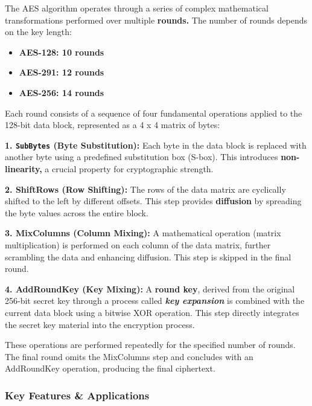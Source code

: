 The AES algorithm operates through a series of complex mathematical transformations performed over multiple \textbf{rounds. }The number of rounds depends on the key length:

\begin{itemize}
    \item \textbf{\textbf{AES-128: }10 rounds}
    \item \textbf{\textbf{AES-291: }12 rounds}
    \item \textbf{\textbf{AES-256: 14 rounds}}
\end{itemize}

Each round consists of a sequence of four fundamental operations applied to the 128-bit data block, represented as a 4 x 4 matrix of bytes:

\textbf{1. \texttt{SubBytes} (Byte Substitution): }Each byte in the data block is replaced with another byte using a predefined substitution box (S-box). This introduces \textbf{non-linearity, }a crucial property for cryptographic strength.

\textbf{2. ShiftRows (Row Shifting): }The rows of the data matrix are cyclically shifted to the left by different offsets. This step provides \textbf{diffusion} by spreading the byte values across the entire block.

\textbf{3. MixColumns (Column Mixing): }A mathematical operation (matrix multiplication) is performed on each column of the data matrix, further scrambling the data and enhancing diffusion. This step is skipped in the final round.

\textbf{4. AddRoundKey (Key Mixing): }A \textbf{round key}, derived from the original 256-bit secret key through a process called \textit{\textbf{key expansion}} is combined with the current data block using a bitwise XOR operation. This step directly integrates the secret key material into the encryption process.

These operations are performed repeatedly for the specified number of rounds. The final round omits the MixColumns step and concludes with an AddRoundKey operation, producing the final ciphertext.

\subsubsection{\textbf{Key Features \& Applications}}

